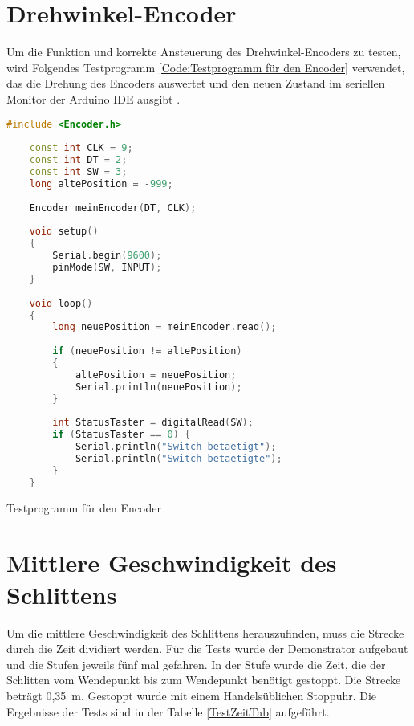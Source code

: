 \section{Drehwinkel-Encoder}

Um die Funktion und korrekte Ansteuerung des Drehwinkel-Encoders zu testen, wird Folgendes Testprogramm \ref{Code:Testprogramm für den Encoder} verwendet, das die Drehung des Encoders auswertet und den neuen Zustand im seriellen Monitor der Arduino IDE ausgibt \cite{Funduino.2024}.

\begin{code}
	\begin{lstlisting}[language=c++]
	#include <Encoder.h>
	
	const int CLK = 9;
	const int DT = 2;
	const int SW = 3;
	long altePosition = -999;
	
	Encoder meinEncoder(DT, CLK);
	
	void setup()
	{
		Serial.begin(9600);
		pinMode(SW, INPUT);
	}
	
	void loop()
	{
		long neuePosition = meinEncoder.read();
		
		if (neuePosition != altePosition)
		{
			altePosition = neuePosition;
			Serial.println(neuePosition);
		}
		
		int StatusTaster = digitalRead(SW);
		if (StatusTaster == 0) {
			Serial.println("Switch betaetigt");
			Serial.println("Switch betaetigte");
		}
	}
\end{lstlisting}      

\caption[Testprogramm für den Encoder]{Testprogramm für den Encoder}\label{Code:Testprogramm für den Encoder}    
\end{code}

\section{Mittlere Geschwindigkeit des Schlittens}

Um die mittlere Geschwindigkeit des Schlittens herauszufinden, muss die Strecke durch die Zeit dividiert werden. Für die Tests wurde der Demonstrator aufgebaut und die Stufen jeweils fünf mal gefahren. In der Stufe wurde die Zeit, die der Schlitten vom Wendepunkt bis zum Wendepunkt benötigt gestoppt. Die Strecke beträgt 0,35\ m. Gestoppt wurde mit einem Handelsüblichen Stoppuhr. Die Ergebnisse der Tests sind in der Tabelle \ref{TestZeitTab} aufgeführt.

